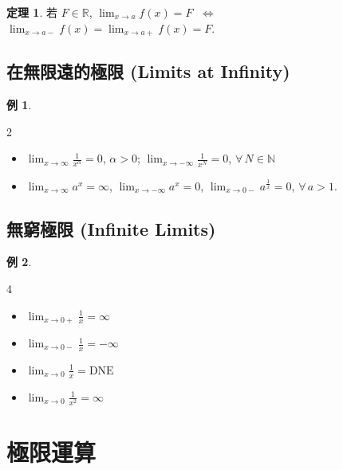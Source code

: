 \documentclass[12pt]{extarticle}
\newcommand{\ds}{\displaystyle}
\newcommand{\ifff}{\;\Longleftrightarrow\;}
\theoremstyle{definition}
\newtheorem*{thm}{定理}
\newtheorem*{ex}{例}
\begin{document}
\begin{thm}
  若 $F\in\mathbb{R}$, $\ds\lim_{x\to a}f(x) = F$ $\ifff$ $\ds\lim_{x\to a-} f(x) = \ds\lim_{x\to a+} f(x) = F$. 
\end{thm}

\subsection*{在無限遠的極限 (Limits at Infinity) }
\begin{ex}
  \begin{multicols}{2}
    \begin{itemize}\setlength\itemsep{0em}
      \item $\ds\lim_{x\to\infty}\frac{1}{x^\alpha} = 0$, $\alpha > 0$; $\ds\lim_{x\to-\infty}\frac{1}{x^N} = 0$, $\forall\,N\in\mathbb{N}$
      \item $\ds\lim_{x\to\infty}a^x = \infty$, $\ds\lim_{x\to-\infty}a^x = 0$, $\ds\lim_{x\to0-}a^{\frac{1}{x}} = 0$, $\forall\,a > 1$. 
    \end{itemize}
  \end{multicols}
\end{ex}

\subsection*{無窮極限 (Infinite Limits) }
\begin{ex}
  \setlength{\columnsep}{-20mm}
  \begin{multicols}{4}
    \begin{itemize}\setlength\itemsep{0em}
      \item $\ds\lim_{x\to0+}\frac{1}{x} = \infty$
      \item $\ds\lim_{x\to0-}\frac{1}{x} = -\infty$
      \item $\ds\lim_{x\to0}\frac{1}{x} = \text{DNE}$
      \item $\ds\lim_{x\to0}\frac{1}{x^2} = \infty$
    \end{itemize}
  \end{multicols}
\end{ex}

\section*{極限運算}
\end{document}

